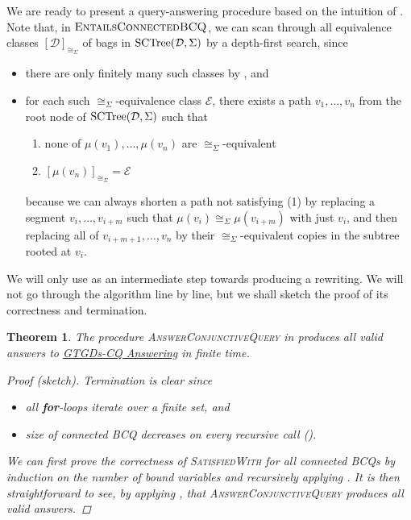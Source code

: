 \documentclass[12pt]{report}
\theoremstyle{plain}
\newtheorem{theorem}{Theorem}[chapter]
\theoremstyle{definition}
\newcommand{\SCTree}[2]{\ensuremath{\normalfont{\textrm{SCTree}}\!\left( #1, #2 \right)}}
\begin{document}
We are ready to present a query-answering procedure  based on the intuition of . Note that, in $\textsc{EntailsConnectedBCQ}$, we can scan through all equivalence classes $[\mathcal{D}]_{\cong_\Sigma}$ of bags in $\SCTree{\mathcal{D}}{\Sigma}$ by a depth-first search, since
\begin{itemize}
  \item there are only finitely many such classes by , and
  \item for each such $\cong_\Sigma$-equivalence class $\mathcal{E}$, there exists a path $v_1, \ldots, v_n$ from the root node of $\SCTree{\mathcal{D}}{\Sigma}$ such that
  \begin{enumerate}
    \item none of $\mu(v_1), \ldots, \mu(v_n)$ are $\cong_\Sigma$-equivalent
    \item $[\mu(v_n)]_{\cong_\Sigma} = \mathcal{E}$
  \end{enumerate}
  because we can always shorten a path not satisfying (1) by replacing a segment $v_i, \ldots, v_{i+m}$ such that $\mu(v_i) \cong_\Sigma \mu(v_{i+m})$ with just $v_i$, and then replacing all of $v_{i+m+1}, \ldots, v_n$ by their $\cong_\Sigma$-equivalent copies in the subtree rooted at $v_i$.
\end{itemize}

We will only use  as an intermediate step towards producing a rewriting. We will not go through the algorithm line by line, but we shall sketch the proof of its correctness and termination.

\begin{theorem}
  The procedure \textsc{AnswerConjunctiveQuery} in  produces all valid answers to \hyperref[GTGDs-CQ-Answering]{GTGDs-CQ Answering} in finite time.
  \begin{proof}[Proof (sketch)]
    Termination is clear since
    \begin{itemize}
      \item all \textbf{for}-loops iterate over a finite set, and
      \item size of connected BCQ decreases on every recursive call ().
    \end{itemize}

    We can first prove the correctness of \textsc{SatisfiedWith} for all connected BCQs by induction on the number of bound variables and recursively applying . It is then straightforward to see, by applying , that \textsc{AnswerConjunctiveQuery} produces all valid answers.
  \end{proof}
\end{theorem}
\end{document}
